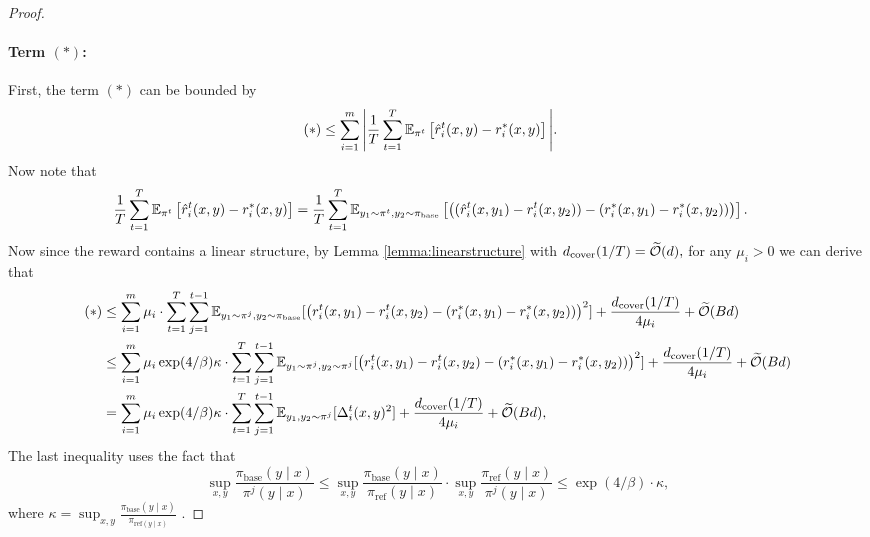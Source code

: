 \begin{proof}
\paragraph{Term $(\ast)$:}
First, the term $(\ast)$ can be bounded by 
\begin{align*}
\mathrm{(*)}&\le \sum_{i=1}^m\Bigg|\frac{1}{T}\sum_{t=1}^T \mathbb{E}_{\pi^t}\left[  \hat{r}_i^t(x,y) - r_i^*(x,y)\right]\Bigg|.\end{align*}
Now note that 
\begin{align}
&\frac{1}{T}\sum_{t=1}^T \mathbb{E}_{\pi^t}\left[  \hat{r}_i^t(x,y) - r_i^*(x,y)\right]= \frac{1}{T}\sum_{t=1}^T \mathbb{E}_{y_1\sim \pi^t,y_2\sim \pi_{\mathrm{base}}}\left[ \left((\hat{r}_i^t(x,y_1)- r_i^t(x,y_2)) - (r_i^*(x,y_1)  - r_i^*(x,y_2))\right) \right].\label{eq:first step}
\end{align}
Now since the reward contains a linear structure, by Lemma \ref{lemma:linearstructure} with $d_{\mathrm{cover}}(1/T) = \widetilde{\mathcal{O}}(d),$ for any $\mu_i>0$ we can derive that 
\begin{align}
    (*)&\le \sum_{i=1}^m \mu_i \cdot \sum_{t=1}^T   \sum_{j=1}^{t-1}\mathbb{E}_{y_1\sim \pi^j, y_2\sim \pi_{\textrm{base}}}[\left(r_i^t(x,y_1)-r_i^t(x,y_2) - (r_i^*(x,y_1)-r_i^*(x,y_2))\right)^2] + \frac{d_{\mathrm{cover}}(1/T)}{4\mu_i} + \widetilde{\mathcal{O}}(Bd)\nonumber\\
    &\le\sum_{i=1}^m\mu_i \exp(4/\beta)\kappa\cdot \sum_{t=1}^T   \sum_{j=1}^{t-1}\mathbb{E}_{y_1\sim \pi^j, y_2\sim \pi^j}[\left(r_i^t(x,y_1)-r_i^t(x,y_2) - (r_i^*(x,y_1)-r_i^*(x,y_2))\right)^2] + \frac{d_{\mathrm{cover}}(1/T)}{4\mu_i}+ \widetilde{\mathcal{O}}(Bd)
    \nonumber\\& =\sum_{i=1}^m \mu_i \exp(4/\beta)\kappa\cdot \sum_{t=1}^T \sum_{j=1}^{t-1}\mathbb{E}_{y_1,y_2\sim \pi^j}[\Delta_i^t(x,y)^2] + \frac{d_{\mathrm{cover}}(1/T)}{4\mu_i}+ \widetilde{\mathcal{O}}(Bd),\label{ineq:(A)}
\end{align}
The last inequality uses the fact that 
$$\sup_{x,y} \frac{\pi_{\mathrm{base}}(y\mid x)}{\pi^j(y\mid x)} \le \sup_{x,y} \frac{\pi_{\mathrm{base}}(y\mid x)}{\pi_{\mathrm{ref}}(y\mid x)}\cdot \sup_{x,y}\frac{\pi_{\mathrm{ref}}(y\mid x)}{\pi^j(y\mid x)} \le \exp(4/\beta)\cdot \kappa,$$
where $\kappa = \sup_{x,y} \frac{\pi_{\mathrm{base}}(y\mid x)}{\pi_{\mathrm{ref}(y\mid x)}}$ \citep{cen2024value}.

\end{proof}
